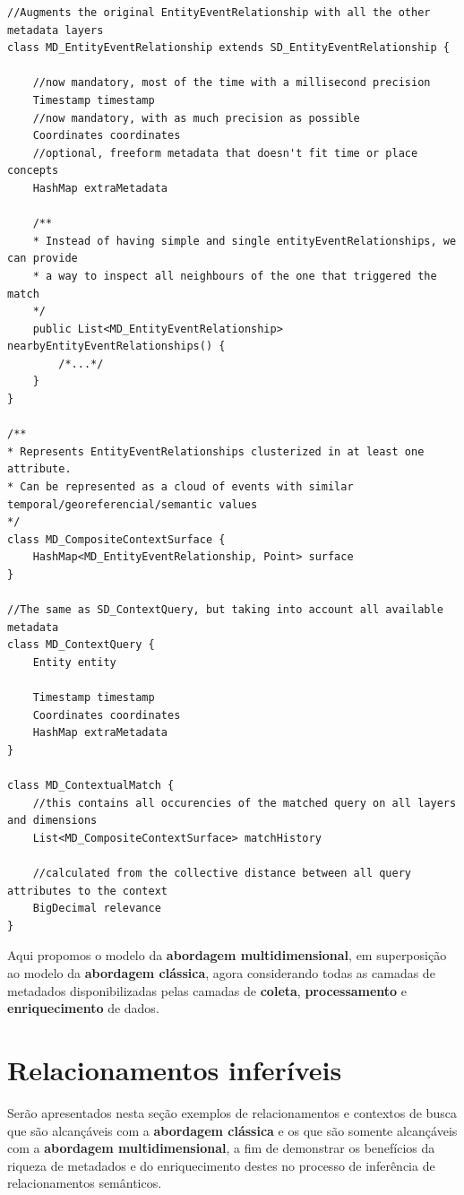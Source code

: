 \begin{verbatim}
//Augments the original EntityEventRelationship with all the other metadata layers
class MD_EntityEventRelationship extends SD_EntityEventRelationship {
    
    //now mandatory, most of the time with a millisecond precision
    Timestamp timestamp
    //now mandatory, with as much precision as possible
    Coordinates coordinates
    //optional, freeform metadata that doesn't fit time or place concepts
    HashMap extraMetadata

    /**
    * Instead of having simple and single entityEventRelationships, we can provide
    * a way to inspect all neighbours of the one that triggered the match
    */
    public List<MD_EntityEventRelationship> nearbyEntityEventRelationships() {
        /*...*/
    }
}

/**
* Represents EntityEventRelationships clusterized in at least one attribute.
* Can be represented as a cloud of events with similar temporal/georeferencial/semantic values
*/
class MD_CompositeContextSurface {
    HashMap<MD_EntityEventRelationship, Point> surface
}

//The same as SD_ContextQuery, but taking into account all available metadata
class MD_ContextQuery {
    Entity entity

    Timestamp timestamp
    Coordinates coordinates
    HashMap extraMetadata
}

class MD_ContextualMatch {
    //this contains all occurencies of the matched query on all layers and dimensions
    List<MD_CompositeContextSurface> matchHistory

    //calculated from the collective distance between all query attributes to the context
    BigDecimal relevance
}
\end{verbatim}

Aqui propomos o modelo da \textbf{abordagem multidimensional}, em superposição ao modelo da \textbf{abordagem clássica}, agora considerando todas as camadas de metadados disponibilizadas pelas camadas de \textbf{coleta}, \textbf{processamento} e \textbf{enriquecimento} de dados.

\section{Relacionamentos inferíveis}

Serão apresentados nesta seção exemplos de relacionamentos e contextos de busca que são alcançáveis com a \textbf{abordagem clássica} e os que são somente alcançáveis com a \textbf{abordagem multidimensional}, a fim de demonstrar os benefícios da riqueza de metadados e do enriquecimento destes no processo de inferência de relacionamentos semânticos.

